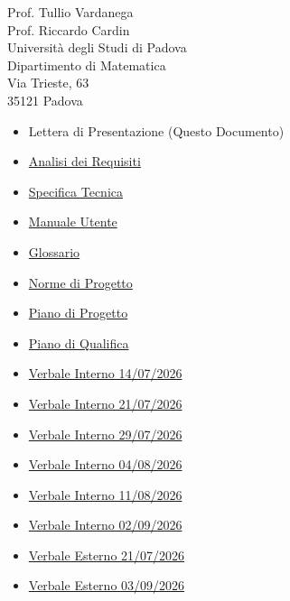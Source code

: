 \documentclass[a4paper,11pt]{letter}
\begin{document}
\begin{letter}{Prof. Tullio Vardanega\\Prof. Riccardo Cardin\\Università degli Studi di Padova\\Dipartimento di Matematica\\Via Trieste, 63\\35121 Padova}
  \begin{multicols}{2}
  \begin{itemize}[noitemsep, topsep=0pt]
    \item Lettera di Presentazione (Questo Documento)
    \item \href{https://alittlebyte-19.github.io/Documentazione/PB/Documenti%20esterni/Analisi%20dei%20Requisiti/Analisi%20dei%20Requisiti.html}{Analisi dei Requisiti}
    \item \href{https://alittlebyte-19.github.io/Documentazione/PB/Documenti%20esterni/Specifica%20Tecnica/Specifica%20Tecnica.html}{Specifica Tecnica}
    \item \href{https://alittlebyte-19.github.io/Documentazione/PB/Documenti%20esterni/Manuale%20Utente/Manuale%20Utente.html}{Manuale Utente}
    \item \href{https://alittlebyte-19.github.io/Documentazione/glossario.html}{Glossario}
    \item \href{https://alittlebyte-19.github.io/Documentazione/PB/Documenti%20interni/Norme%20di%20Progetto/Norme%20di%20Progetto.html}{Norme di Progetto}
    \item \href{https://alittlebyte-19.github.io/Documentazione/PB/Documenti%20esterni/Piano%20di%20Progetto/Piano%20di%20Progetto.html}{Piano di Progetto}
    \item \href{https://alittlebyte-19.github.io/Documentazione/PB/Documenti%20esterni/Piano%20di%20Qualifica/Piano%20di%20Qualifica.html}{Piano di Qualifica}
    \item \href{https://alittlebyte-19.github.io/Documentazione/PB/Verbali/Verbali%20Interni/Verbale_Interno_2026_07_14.html}{Verbale Interno 14/07/2026}
    \item \href{https://alittlebyte-19.github.io/Documentazione/PB/Verbali/Verbali%20Interni/Verbale_Interno_2026-07-21.html}{Verbale Interno 21/07/2026}
    \item \href{https://alittlebyte-19.github.io/Documentazione/PB/Verbali/Verbali%20Interni/Verbale_Interno_2026_07_29.html}{Verbale Interno 29/07/2026}
    \item \href{https://alittlebyte-19.github.io/Documentazione/PB/Verbali/Verbali%20Interni/Verbale_Interno_2026_08_04.html}{Verbale Interno 04/08/2026}
    \item \href{https://alittlebyte-19.github.io/Documentazione/PB/Verbali/Verbali%20Interni/Verbale_Interno_2026_08_11.html}{Verbale Interno 11/08/2026}
    \item \href{https://alittlebyte-19.github.io/Documentazione/PB/Verbali/Verbali%20Interni/Verbale_Interno_2026_09_02.html}{Verbale Interno 02/09/2026}
    \item \href{https://alittlebyte-19.github.io/Documentazione/PB/Verbali/Verbali%20Esterni/Verbale_Esterno_2026_07_21.html}{Verbale Esterno 21/07/2026}
    \item \href{https://alittlebyte-19.github.io/Documentazione/PB/Verbali/Verbali%20Esterni/Verbale_Esterno_2026_09_03_FIRMATO.html}{Verbale Esterno 03/09/2026}
    

\end{itemize}
\end{multicols}
\end{letter}
\end{document}
